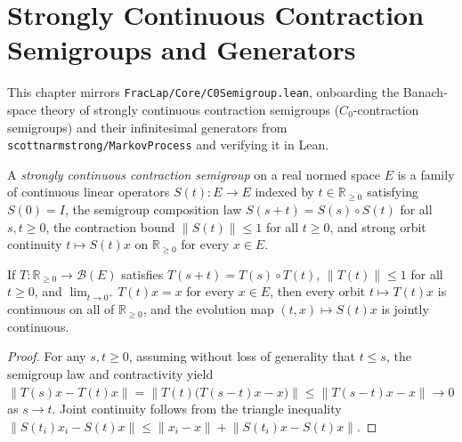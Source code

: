 \chapter{Strongly Continuous Contraction Semigroups and Generators}

This chapter mirrors \texttt{FracLap/Core/C0Semigroup.lean}, onboarding the Banach-space theory of strongly continuous contraction semigroups ($C_0$-contraction semigroups) and their infinitesimal generators from \texttt{scottnarmstrong/MarkovProcess} and verifying it in Lean.

\begin{definition}\label{def:c0_contraction_semigroup}
\leanok
A \emph{strongly continuous contraction semigroup} on a real normed space $E$ is a family of continuous linear operators $S(t) : E \to E$ indexed by $t \in \mathbb{R}_{\ge 0}$ satisfying $S(0) = I$, the semigroup composition law $S(s + t) = S(s) \circ S(t)$ for all $s, t \ge 0$, the contraction bound $\lVert S(t) \rVert \le 1$ for all $t \ge 0$, and strong orbit continuity $t \mapsto S(t)x$ on $\mathbb{R}_{\ge 0}$ for every $x \in E$.
\end{definition}

\begin{theorem}\label{thm:c0_orbit_continuity_from_zero}
\leanok
If $T : \mathbb{R}_{\ge 0} \to \mathcal{B}(E)$ satisfies $T(s + t) = T(s) \circ T(t)$, $\lVert T(t) \rVert \le 1$ for all $t \ge 0$, and $\lim_{t \to 0^+} T(t)x = x$ for every $x \in E$, then every orbit $t \mapsto T(t)x$ is continuous on all of $\mathbb{R}_{\ge 0}$, and the evolution map $(t, x) \mapsto S(t)x$ is jointly continuous.
\end{theorem}

\begin{proof}
\leanok
For any $s, t \ge 0$, assuming without loss of generality that $t \le s$, the semigroup law and contractivity yield $\lVert T(s)x - T(t)x \rVert = \lVert T(t)\bigl(T(s - t)x - x\bigr) \rVert \le \lVert T(s - t)x - x \rVert \to 0$ as $s \to t$. Joint continuity follows from the triangle inequality $\lVert S(t_i)x_i - S(t)x \rVert \le \lVert x_i - x \rVert + \lVert S(t_i)x - S(t)x \rVert$.
\end{proof}

